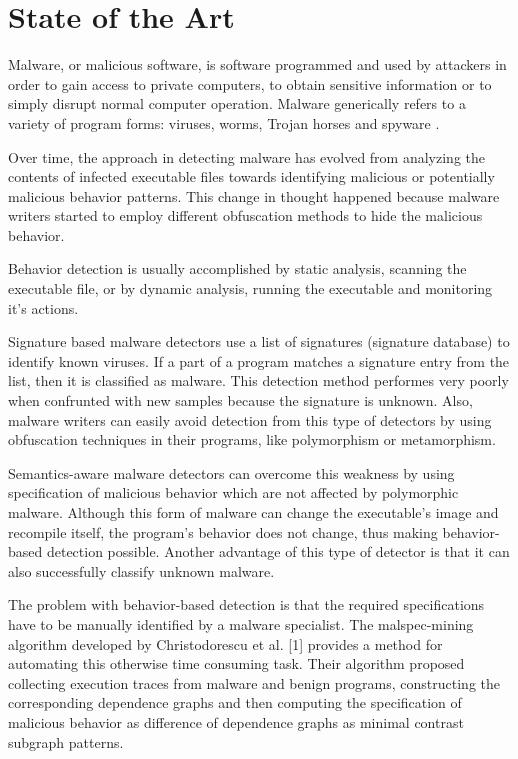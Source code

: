 \chapter{State of the Art}
\label{chapter:second-chapter}

Malware, or malicious software, is software programmed and used by attackers in order to gain access to private computers, to obtain sensitive information or to simply disrupt normal computer operation. Malware generically refers to a variety of program forms: viruses, worms, Trojan horses and spyware \cite{mining-specifications}.

Over time, the approach in detecting malware has evolved from analyzing the contents of infected executable files towards identifying malicious or potentially malicious behavior patterns. This change in thought happened because malware writers started to employ different obfuscation methods to hide the malicious behavior.

Behavior detection is usually accomplished by static analysis, scanning the executable file, or by dynamic analysis, running the executable and monitoring it's actions.

Signature based malware detectors use a list of signatures (signature database) to identify known viruses. If a part of a program matches a signature entry from the list, then it is classified as malware. This detection method performes very poorly when confrunted with new samples because the signature is unknown. Also, malware writers can easily avoid detection from this type of detectors by using obfuscation techniques in their programs, like polymorphism or metamorphism.

Semantics-aware malware detectors can overcome this weakness by using specification of malicious behavior which are not affected by polymorphic malware. Although this form of malware can change the executable’s image and recompile itself, the program’s behavior does not change, thus making behavior-based detection possible. Another advantage of this type of detector is that it can also successfully classify unknown malware.

The problem with behavior-based detection is that the required specifications have to be manually identified by a malware specialist. The malspec-mining algorithm developed by Christodorescu et al. [1] provides a method for automating this otherwise time consuming task. Their algorithm proposed collecting execution traces from malware and benign programs, constructing the corresponding dependence graphs and then computing the specification of malicious behavior as difference of dependence graphs as minimal contrast subgraph patterns.

